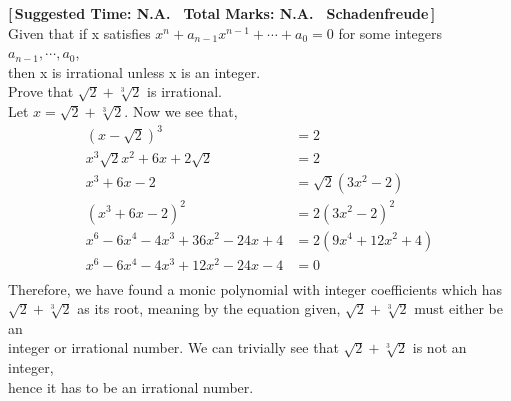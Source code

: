 \textbf{\hypertarget{P9}{[\,Suggested Time: N.A. \textbar \, Total Marks: N.A. \textbar \, Schadenfreude\,]}} \\
    Given that if x satisfies \(\displaystyle x^{n}+a_{n-1}x^{n-1}+\cdots+a_{0} = 0\) for some integers \(a_{n-1},\cdots, a_{0}\), \\
    then x is irrational unless x is an integer. \\
    Prove that \(\sqrt{2}+\sqrt[3]{2}\) is irrational. \\




    Let \(\displaystyle x = \sqrt{2}+\sqrt[3]{2}\). Now we see that,
    \begin{align*}
        \displaystyle       \left(x-\sqrt{2}\right)^{3} &= 2 \\
        \displaystyle   x^{3}\sqrt{2}x^{2}+6x+2\sqrt{2} &= 2 \\
        \displaystyle                        x^{3}+6x-2 &= \sqrt{2}\left(3x^{2}-2\right) \\
        \displaystyle       \left(x^{3}+6x-2\right)^{2} &= 2\left(3x^{2}-2\right)^{2} \\
        \displaystyle x^{6}-6x^{4}-4x^{3}+36x^{2}-24x+4 &= 2(9x^{4}+12x^{2}+4) \\
        \displaystyle x^{6}-6x^{4}-4x^{3}+12x^{2}-24x-4 &= 0 \\
    \end{align*}
    Therefore, we have found a monic polynomial with integer coefficients which has \\
    \(\displaystyle \sqrt{2}+\sqrt[3]{2}\) as its root, meaning by the equation given, \(\displaystyle \sqrt{2}+\sqrt[3]{2}\) must either be an \\
    integer or irrational number. We can trivially see that \(\displaystyle \sqrt{2}+\sqrt[3]{2}\) is not an integer, \\
    hence it has to be an irrational number.

    \newpage \ \newpage
